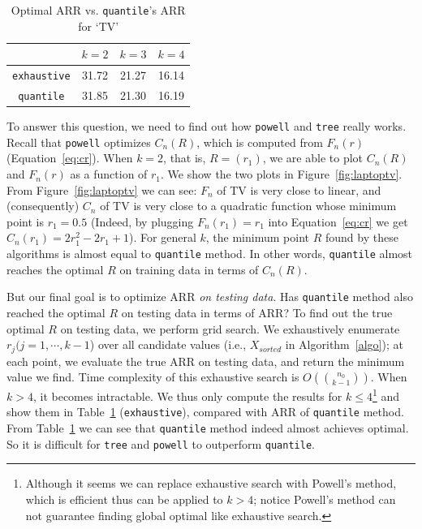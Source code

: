 \begin{table}[ht]
\vspace{-0.05in}
\centering
\begin{tabular}{|c|c|c|c|}
\hline
   & $k=2$ & $k=3$ & $k=4$ \\
\hline
\texttt{exhaustive} & 31.72 & 21.27 & 16.14\\ \hline
\texttt{quantile} & 31.85 & 21.30 & 16.19\\ \hline
\end{tabular}
\caption{Optimal ARR vs. \texttt{quantile}'s ARR for `TV'\label{tab:opt}}
\vspace{-0.05in}
\end{table}

To answer this question, we need to find out how \texttt{powell} and \texttt{tree} really works. Recall that \texttt{powell} optimizes $C_n(R)$, which is computed from $F_n(r)$ (Equation~\ref{eq:cr}). When $k=2$, that is, $R=(r_1)$, we are able to plot $C_n(R)$ and $F_n(r)$ as a function of $r_1$. We show the two plots in Figure~\ref{fig:laptoptv}. From Figure~\ref{fig:laptoptv} we can see: $F_n$ of TV is very close to linear, and (consequently) $C_n$ of TV is very close to a quadratic function whose minimum point is $r_1=0.5$ (Indeed, by plugging $F_n(r_1) = r_1$ into Equation~\ref{eq:cr} we get $C_n(r_1) = 2r_1^2 - 2r_1 + 1$). For general $k$, the minimum point $R$ found by these algorithms is almost equal to \texttt{quantile} method. In other words, \texttt{quantile} almost reaches the optimal $R$ on training data in terms of $C_n(R)$.

But our final goal is to optimize ARR \emph{on testing data}. Has \texttt{quantile} method also reached the optimal $R$ on testing data in terms of ARR? To find out the true optimal $R$ on testing data, we perform grid search. We exhaustively enumerate $r_j (j=1,\cdots, k-1$) over all candidate values (i.e., $X_{sorted}$ in Algorithm~\ref{algo}); at each point, we evaluate the true ARR on testing data, and return the minimum value we find. Time complexity of this exhaustive search is $O({{n_0}\choose{k-1}})$. When $k>4$, it becomes intractable. We thus only compute the results for $k\leq 4$\footnote{Although it seems we can replace exhaustive search with Powell's method, which is efficient thus can be applied to $k > 4$; notice Powell's method can not guarantee finding global optimal like exhaustive search.} and show them in Table~\ref{tab:opt} (\texttt{exhaustive}), compared with ARR of \texttt{quantile} method. From Table~\ref{tab:opt} we can see that \texttt{quantile} method indeed almost achieves optimal. So it is difficult for \texttt{tree} and \texttt{powell} to outperform \texttt{quantile}. 

